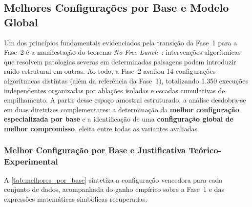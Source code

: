 \subsection{Melhores Configurações por Base e Modelo Global}
\label{sec:melhores}

Um dos princípios fundamentais evidenciados pela transição da Fase~1 para a
Fase~2 é a manifestação do teorema \emph{No Free Lunch}~\cite{wolpert1997no}:
intervenções algorítmicas que resolvem patologias severas em determinadas
paisagens podem introduzir ruído estrutural em outras. Ao todo, a Fase~2 avaliou
14 configurações algorítmicas distintas (além da referência da Fase~1), totalizando
1.350 execuções independentes organizadas por ablações isoladas e escadas
cumulativas de empilhamento. A partir desse espaço amostral estruturado, a análise
desdobra-se em duas diretrizes complementares: a determinação da \textbf{melhor
configuração especializada por base} e a identificação de uma \textbf{configuração
global de melhor compromisso}, eleita entre todas as variantes avaliadas.

\subsubsection{Melhor Configuração por Base e Justificativa Teórico-Experimental}
\label{sec:melhor_por_base}

A \cref{tab:melhores_por_base} sintetiza a configuração vencedora para cada
conjunto de dados, acompanhada do ganho empírico sobre a Fase~1 e das
expressões matemáticas simbólicas recuperadas.

\begin{table}[htbp]
  \centering
  \caption{Melhor configuração encontrada para cada base de dados (30 repetições).}
  \label{tab:melhores_por_base}
  \small
\end{table}

